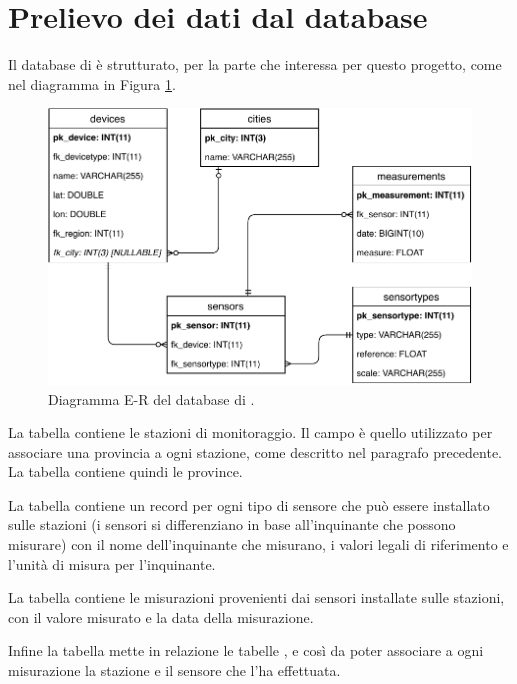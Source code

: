 \section{Prelievo dei dati dal database}\label{sec:database}

Il database di \MonIQA{} è strutturato, per la parte che interessa per questo
progetto, come nel diagramma in Figura \ref{fig:dbarch}.

\begin{figure}[htb]
	\centering
	\includegraphics[width=\textwidth]{img/dbarch}
	\caption{Diagramma E-R del database di \MonIQA\@.}\label{fig:dbarch}
\end{figure}

La tabella  contiene le stazioni di monitoraggio. Il campo
 è quello utilizzato per associare una provincia a ogni stazione,
come descritto nel paragrafo precedente. La tabella  contiene
quindi le province.

La tabella  contiene un record per ogni tipo di sensore che
può essere installato sulle stazioni (i sensori si differenziano in base
all'inquinante che possono misurare) con il nome dell'inquinante che misurano, i
valori legali di riferimento e l'unità di misura per l'inquinante.

La tabella  contiene le misurazioni provenienti dai sensori
installate sulle stazioni, con il valore misurato e la data della misurazione.

Infine la tabella  mette in relazione le tabelle ,
 e  così da poter associare a ogni
misurazione la stazione e il sensore che l'ha effettuata.

